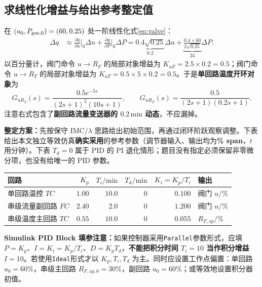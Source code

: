 \documentclass[UTF8,a4paper,11pt]{ctexart}
\newcommand{\dev}{\Delta}
\newcommand{\unit}[1]{\,\mathrm{#1}}
\begin{document}
\subsection{求线性化增益与给出参考整定值}
在 $(u_0,P_{\rm gas,0})=(60,0.25)$ 处一阶线性化式\eqref{eq:valve}：
\begin{align}
\dev q &\approx \frac{\partial q}{\partial u}\bigg|_0\dev u+\frac{\partial q}{\partial P}\bigg|_0\dev P
=\underbrace{0.4\sqrt{0.25}}_{0.2}\dev u
+\underbrace{\frac{0.4\times60}{2\sqrt{0.25}}}_{24}\dev P.\label{eq:linear}
\end{align}
以百分量计，阀门命令 $u\rightarrow R_F$ 的局部对象增益为 $K_{uF}=2.5\times0.2=0.5$；阀门命令 $u\rightarrow R_T$ 的局部对象增益为 $K_{uT}=0.5\times5\times0.2=0.5$。于是\textbf{单回路温度开环对象}为
\begin{equation}
G_{uR_T}(s)=\frac{0.5e^{-5s}}{(2s+1)^2(10s+1)},\qquad
G_{uR_F}(s)=\frac{0.5}{(2s+1)(0.2s+1)}.
\end{equation}
注意右式包含了\textbf{副回路流量变送器的 $0.2\unit{min}$ 动态}，不应漏掉。

\textbf{整定方案：}先按保守 IMC/$\lambda$ 思路给出初始范围，再通过闭环阶跃观察调整。下表给出本文独立等效仿真\textbf{确实采用}的参考参数（调节器输入、输出均为\textbf{\% span}，$t$ 用分钟）。下表 $T_d=0$ 属于 PID 的 PI 退化情形；题目没有指定必须保留非零微分项，也没有给唯一的 PID 参数。
\begin{center}
\small
\begin{tabular}{p{.32\linewidth}rrrrp{.17\linewidth}}
\toprule
回路 & $K_p$ & $T_i/\mathrm{min}$ & $T_d/\mathrm{min}$ & $K_i=K_p/T_i$ & 输出 \\
\midrule
单回路温控 $TC$ & $1.00$ & $10.0$ & $0$ & $0.100$ & 阀门 $u/\%$\\
串级流量副回路 $FC$ & $2.40$ & $2.0$ & $0$ & $1.200$ & 阀门 $u/\%$\\
串级温度主回路 $TC$ & $0.55$ & $10.0$ & $0$ & $0.055$ & $R_{F,sp}/\%$\\
\bottomrule
\end{tabular}
\end{center}
\begin{warnbox}
\textbf{Simulink PID Block 填参注意：}如果控制器采用\texttt{Parallel}参数形式，应填 $P=K_p$、$I=K_i=K_p/T_i$、$D=K_pT_d$，\textbf{不能把积分时间 $T_i=10$ 当作积分增益 $I=10$}。若使用\texttt{Ideal}形式才以 $K_p,T_i,T_d$ 为主。同时应设置工作点偏置：单回路 $u_0=60\%$，串级主回路 $R_{F,sp,0}=30\%$，副回路 $u_0=60\%$；或等效地设置积分器初值。
\end{warnbox}
\end{document}
